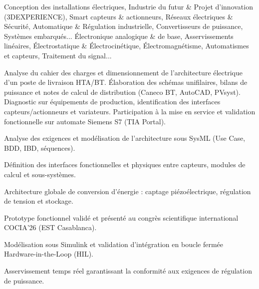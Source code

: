 \documentclass[10pt,a4paper]{../altacv}
\begin{document}
\cvidentite
{}
\makecvheader

\cvformation
{Conception des installations électriques, Industrie du futur \& Projet d'innovation (3DEXPERIENCE), Smart capteurs \& actionneurs, Réseaux électriques \& Sécurité, Automatique \& Régulation industrielle, Convertisseurs de puissance, Systèmes embarqués...}
{Électronique analogique \& de base, Asservissements linéaires, Électrostatique \& Électrocinétique, Électromagnétisme, Automatismes et capteurs, Traitement du signal...}

\expcore
{Analyse du cahier des charges et dimensionnement de l’architecture électrique d’un poste de livraison HTA/BT.}
{Élaboration des schémas unifilaires, bilans de puissance et notes de calcul de distribution (Caneco BT, AutoCAD, PVsyst).}
\vspace{2pt}
\expmenara
{Diagnostic sur équipements de production, identification des interfaces capteurs/actionneurs et variateurs.}
{Participation à la mise en service et validation fonctionnelle sur automate Siemens S7 (TIA Portal).}

\begin{cvitems}
  \item Analyse des exigences et modélisation de l’architecture sous SysML (Use Case, BDD, IBD, séquences).
  \item Définition des interfaces fonctionnelles et physiques entre capteurs, modules de calcul et sous-systèmes.
\end{cvitems}
\vspace{2pt}
\begin{cvitems}
  \item Architecture globale de conversion d’énergie : captage piézoélectrique, régulation de tension et stockage.
  \item Prototype fonctionnel validé et présenté au congrès scientifique international COCIA’26 (EST Casablanca).
\end{cvitems}
\vspace{2pt}
\begin{cvitems}
  \item Modélisation sous Simulink et validation d’intégration en boucle fermée Hardware-in-the-Loop (HIL).
  \item Asservissement temps réel garantissant la conformité aux exigences de régulation de puissance.
\end{cvitems}
\end{document}
